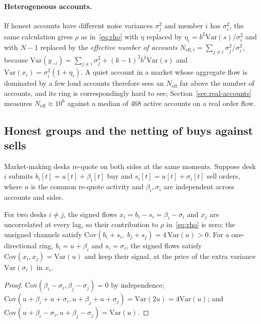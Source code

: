 \paragraph{Heterogeneous accounts.} If honest accounts have different noise variances $\sigma_j^2$ and member $i$ has $\sigma_i^2$, the same calculation gives $\rho$ as in~\eqref{eq:rho} with $\eta$ replaced by $\eta_i=b^2\mathrm{Var}(s)/\sigma_i^2$ and with $N-1$ replaced by the \emph{effective number of accounts} $N_{\mathrm{eff},i}=\sum_{j\ne i}\sigma_j^2/\sigma_i^2$, because $\mathrm{Var}(y_{-i})=\sum_{j\ne i}\sigma_j^2+(k-1)^2b^2\mathrm{Var}(s)$ and $\mathrm{Var}(x_i)=\sigma_i^2(1+\eta_i)$. A quiet account in a market whose aggregate flow is dominated by a few loud accounts therefore sees an $N_{\mathrm{eff}}$ far above the number of accounts, and its ring is correspondingly hard to see; Section~\ref{sec:real-accounts} measures $N_{\mathrm{eff}}\approx10^6$ against a median of 468 active accounts on a real order flow.

\subsection{Honest groups and the netting of buys against sells}\label{sec:netting}

Market-making desks re-quote on both sides at the same moments. Suppose desk $i$ submits $b_i[t]=u[t]+\beta_i[t]$ buy and $s_i[t]=u[t]+\sigma_i[t]$ sell orders, where $u$ is the common re-quote activity and $\beta_i,\sigma_i$ are independent across accounts and sides.

\begin{proposition}[netting]\label{prop:netting}
For two desks $i\ne j$, the signed flows $x_i=b_i-s_i=\beta_i-\sigma_i$ and $x_j$ are uncorrelated at every lag, so their contribution to $\rho$ in~\eqref{eq:rho} is zero; the unsigned channels satisfy $\mathrm{Cov}(b_i+s_i,\;b_j+s_j)=4\,\mathrm{Var}(u)>0$. For a one-directional ring, $b_i=u+\beta_i$ and $s_i=\sigma_i$, the signed flows satisfy $\mathrm{Cov}(x_i,x_j)=\mathrm{Var}(u)$ and keep their signal, at the price of the extra variance $\mathrm{Var}(\sigma_i)$ in $x_i$.
\end{proposition}
\begin{proof}
$\mathrm{Cov}(\beta_i-\sigma_i,\beta_j-\sigma_j)=0$ by independence; $\mathrm{Cov}(u+\beta_i+u+\sigma_i,u+\beta_j+u+\sigma_j)=\mathrm{Var}(2u)=4\mathrm{Var}(u)$; and $\mathrm{Cov}(u+\beta_i-\sigma_i,u+\beta_j-\sigma_j)=\mathrm{Var}(u)$. \qedhere
\end{proof}

